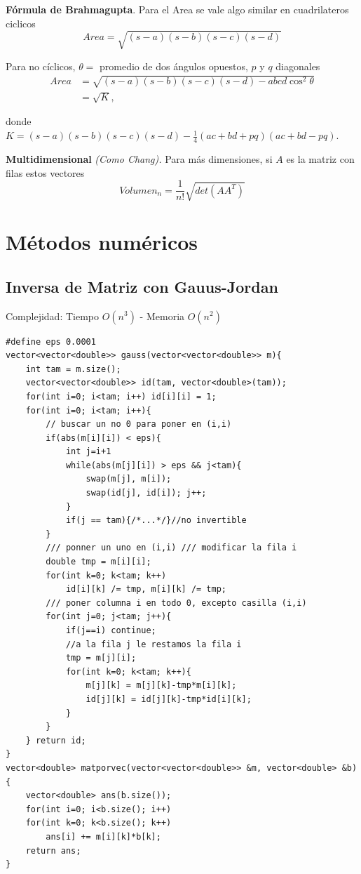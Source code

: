 \documentclass[10pt,spanish,mexico]{article}
\newcommand{\Pa}[1]{\left( #1 \right)}
\numberwithin{equation}{section}
\begin{document}
\begin{multicols}{2}
\textbf{Fórmula de Brahmagupta}. Para el Area se vale algo similar en cuadrilateros ciclicos
\begin{equation*}
    Area = \sqrt{(s-a)(s-b)(s-c)(s-d)}
\end{equation*}

Para no cíclicos, $\theta=$ promedio de dos ángulos opuestos, $p$ y $q$ diagonales
\begin{align*}
    Area &= \sqrt{(s-a)(s-b)(s-c)(s-d)-abcd \cos^2\theta}\\
    &=\sqrt{K},
\end{align*}

donde $K = (s-a)(s-b)(s-c)(s-d) - \frac{1}{4}(ac+bd+pq)(ac+bd-pq)$.

\textbf{Multidimensional} \textit{(Como Chang).} Para más dimensiones, si $A$ es la matriz con filas estos vectores
\begin{equation*}
    Volumen_n = \frac{1}{n!} \sqrt{det\Pa{AA^T}}
\end{equation*}


\hrulefill
\section{Métodos numéricos}
\subsection{Inversa de Matriz con Gauus-Jordan}
Complejidad: Tiempo $O\left(n^3\right)$ - Memoria $O\left(n^2\right)$
\begin{verbatim}
#define eps 0.0001
vector<vector<double>> gauss(vector<vector<double>> m){
    int tam = m.size();
    vector<vector<double>> id(tam, vector<double>(tam));
    for(int i=0; i<tam; i++) id[i][i] = 1;
    for(int i=0; i<tam; i++){
        // buscar un no 0 para poner en (i,i)
        if(abs(m[i][i]) < eps){
            int j=i+1
            while(abs(m[j][i]) > eps && j<tam){
                swap(m[j], m[i]);
                swap(id[j], id[i]); j++;
            }
            if(j == tam){/*...*/}//no invertible
        }
        /// ponner un uno en (i,i) /// modificar la fila i
        double tmp = m[i][i];
        for(int k=0; k<tam; k++)
            id[i][k] /= tmp, m[i][k] /= tmp;
        /// poner columna i en todo 0, excepto casilla (i,i)
        for(int j=0; j<tam; j++){
            if(j==i) continue;
            //a la fila j le restamos la fila i
            tmp = m[j][i];
            for(int k=0; k<tam; k++){
                m[j][k] = m[j][k]-tmp*m[i][k];
                id[j][k] = id[j][k]-tmp*id[i][k];
            }
        }
    } return id;
}
vector<double> matporvec(vector<vector<double>> &m, vector<double> &b){
    vector<double> ans(b.size());
    for(int i=0; i<b.size(); i++)
    for(int k=0; k<b.size(); k++)
        ans[i] += m[i][k]*b[k];
    return ans;
}
\end{verbatim}


\end{multicols}
\end{document}
